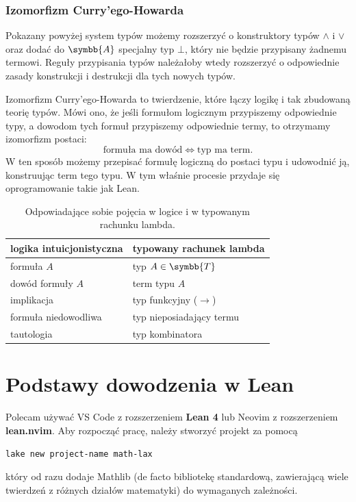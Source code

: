 \documentclass[polish,pretty,bibliography=totocnumbered]{angav}
\begin{document}
\subsubsection{Izomorfizm Curry'ego-Howarda}

Pokazany powyżej system typów możemy rozszerzyć o konstruktory typów $\land$ i $\lor$ oraz dodać do $\symbb{A}$ specjalny typ $\bot$, który nie będzie przypisany żadnemu termowi.
Reguły przypisania typów należałoby wtedy rozszerzyć o odpowiednie zasady konstrukcji i destrukcji dla tych nowych typów.

Izomorfizm Curry'ego-Howarda to twierdzenie, które łączy logikę i tak zbudowaną teorię typów.
Mówi ono, że jeśli formułom logicznym przypiszemy odpowiednie typy, a dowodom tych formuł przypiszemy odpowiednie termy, to otrzymamy izomorfizm postaci:
\[ \text{formuła ma dowód} \iff \text{typ ma term}. \]
W ten sposób możemy przepisać formułę logiczną do postaci typu i udowodnić ją, konstruując term tego typu.
W tym właśnie procesie przydaje się oprogramowanie takie jak Lean.

\begin{table}[H]
    \centering
    \begin{tabular}{ll}
        \hline
        logika intuicjonistyczna & typowany rachunek lambda \\
        \hline
        formuła $A$ & typ $A \in \symbb{T}$ \\
        dowód formuły $A$ & term typu $A$ \\
        implikacja & typ funkcyjny ($\to$) \\
        formuła niedowodliwa & typ nieposiadający termu \\
        tautologia & typ kombinatora \\
        \hline
    \end{tabular}
    \caption{Odpowiadające sobie pojęcia w logice i w typowanym rachunku lambda.}
\end{table}

\section{Podstawy dowodzenia w Lean}

Polecam używać VS Code z rozszerzeniem \textbf{Lean 4} lub Neovim z rozszerzeniem \textbf{lean.nvim}.
Aby rozpocząć pracę, należy stworzyć projekt za pomocą
\begin{verbatim}
lake new project-name math-lax
\end{verbatim}
który od razu dodaje Mathlib (de facto bibliotekę standardową, zawierającą wiele twierdzeń z różnych działów matematyki) do wymaganych zależności.
\end{document}
